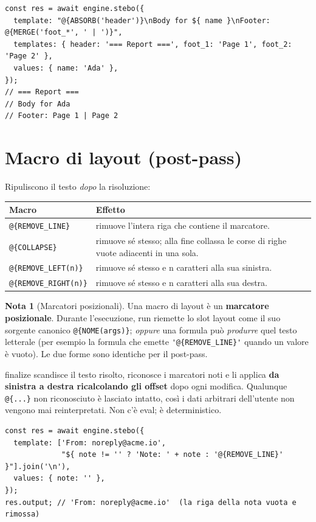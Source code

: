 \documentclass[11pt,a4paper]{book}
\let\code\lstinline
\newcommand{\ic}[1]{{\ttfamily #1}}
\theoremstyle{definition}
\newtheorem*{nota}{Nota}
\begin{document}
{{{{\begin{lstlisting}
const res = await engine.stebo({
  template: "@{ABSORB('header')}\nBody for ${ name }\nFooter: @{MERGE('foot_*', ' | ')}",
  templates: { header: '=== Report ===', foot_1: 'Page 1', foot_2: 'Page 2' },
  values: { name: 'Ada' },
});
// === Report ===
// Body for Ada
// Footer: Page 1 | Page 2
\end{lstlisting}

\section{Macro di layout (post-pass)}

Ripuliscono il testo \emph{dopo} la risoluzione:

\begin{center}
\small
\begin{tabular}{@{}l p{9.4cm}@{}}
\toprule
\textbf{Macro} & \textbf{Effetto} \\
\midrule
\code|@{REMOVE_LINE}| & rimuove l'intera riga che contiene il marcatore. \\
\code|@{COLLAPSE}| & rimuove sé stesso; alla fine collassa le corse di righe vuote
adiacenti in una sola. \\
\code|@{REMOVE_LEFT(n)}| & rimuove sé stesso e \ic{n} caratteri alla sua sinistra. \\
\code|@{REMOVE_RIGHT(n)}| & rimuove sé stesso e \ic{n} caratteri alla sua destra. \\
\bottomrule
\end{tabular}
\end{center}

\begin{nota}[Marcatori posizionali]
Una macro di layout è un \textbf{marcatore posizionale}. Durante l'esecuzione,
\ic{run} riemette lo slot layout come il suo sorgente canonico \code|@{NOME(args)}|;
\emph{oppure} una formula può \emph{produrre} quel testo letterale (per esempio la
formula che emette \code|'@{REMOVE_LINE}'| quando un valore è vuoto). Le due forme
sono identiche per il post-pass.
\end{nota}

\ic{finalize} scandisce il testo risolto, riconosce i marcatori noti e li applica
\textbf{da sinistra a destra ricalcolando gli offset} dopo ogni modifica. Qualunque
\code|@{...}| non riconosciuto è lasciato intatto, così i dati arbitrari dell'utente
non vengono mai reinterpretati. Non c'è \ic{eval}; è deterministico.

\begin{lstlisting}
const res = await engine.stebo({
  template: ['From: noreply@acme.io',
             "${ note != '' ? 'Note: ' + note : '@{REMOVE_LINE}' }"].join('\n'),
  values: { note: '' },
});
res.output; // 'From: noreply@acme.io'  (la riga della nota vuota e rimossa)
\end{lstlisting}

}}}}
\end{document}
